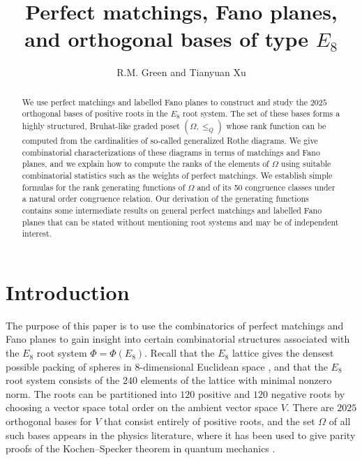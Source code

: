 \documentclass[11pt]{amsart}
\title{Perfect matchings, Fano planes, and orthogonal bases of type $E_8$}
\author{R.M. Green and Tianyuan Xu}
\theoremstyle{plain}
\theoremstyle{definition}
\theoremstyle{remark}
\numberwithin{equation}{section}
\newcommand{\ob}{\Omega}
\begin{document}
\begin{abstract}
We use perfect matchings and labelled Fano planes to construct and study the
$2025$ orthogonal bases of positive roots in the $E_8$ root system. The set of
these bases forms a highly structured, Bruhat-like graded poset $(\ob, \leq_Q)$
whose rank function can be computed from the cardinalities of so-called
generalized Rothe diagrams. We give combinatorial characterizations of these
diagrams in terms of matchings and Fano planes, and we explain how to compute
the ranks of the elements of $\ob$ using suitable combinatorial statistics such
as the weights of perfect matchings. We establish simple formulas for the rank
generating functions of $\ob$ and of its 50 congruence classes under a natural
order congruence relation. Our derivation of the generating functions contains
some intermediate results on general perfect matchings and labelled Fano planes
that can be stated without mentioning root systems and may be of independent
interest. 
\end{abstract}

\maketitle
\section{Introduction}\label{sec:intro}
The purpose of this paper is to use the combinatorics of perfect matchings and
Fano planes to gain insight into certain combinatorial structures associated
with the $E_8$ root system $\Phi=\Phi(E_8)$. Recall that the $E_8$ lattice gives
the densest possible packing of spheres in $8$-dimensional Euclidean space
\cite{viazovska17}, and that the $E_8$ root system consists of the $240$
elements of the lattice with minimal nonzero norm. The roots can be partitioned
into $120$ positive and $120$ negative roots by choosing a vector space total
order on the ambient vector space $V$. There are $2025$ orthogonal bases for $V$
that consist entirely of positive roots, and the set $\ob$ of all such bases
appears in the physics literature, where it has been used to give parity proofs
of the Kochen--Specker theorem in quantum mechanics \cite{waegell15}. 
\end{document}
